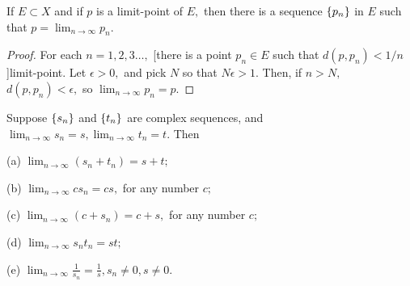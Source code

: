 \documentclass{article}
\begin{document}
\begin{theorem}\label{limit-point-implies-convergent-sequence}
If $E \subset X$ and if $p$ is a \@{limit-point} of $E,$ then there is a \@{sequence} $\left\{ p_n \right\}$ in $E$ such that $p = \lim_{n \to \infty} p_n.$
\end{theorem}

\begin{proof}
For each $n = 1,2,3 \dots,$ \@[there is a point $p_n \in E$ such that $d(p, p_n) < 1/n$]{limit-point}. Let $\epsilon > 0,$ and pick $N$ so that $N \epsilon > 1.$ Then, if $n > N,$ $d(p, p_n) < \epsilon,$ so $\lim_{n \to \infty} p_n = p$.
\end{proof}

\begin{theorem}\label{sums-and-products-of-sequences}
Suppose $\left\{ s_n \right\}$ and $\left\{ t_n \right\}$ are complex \@{sequences}, and $\lim_{n \to \infty} s_n = s, \lim_{n \to \infty} t_n = t.$ Then

(a) $\lim_{n \to \infty} (s_n + t_n) = s + t;$

(b) $\lim_{n \to \infty} c s_n = cs,$ for any number $c;$

(c) $\lim_{n \to \infty} (c + s_n) = c + s,$ for any number $c;$

(d) $\lim_{n \to \infty} s_n t_n = st;$

(e) $\lim_{n \to \infty} \frac{1}{s_n} = \frac{1}{s}, s_n \neq 0, s \neq 0.$
\end{theorem}
\end{document}
